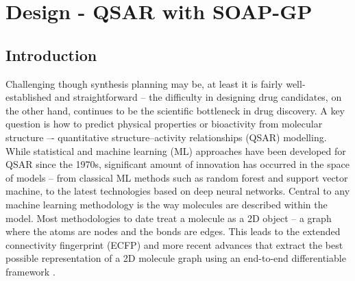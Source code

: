 
\chapter{Design - QSAR with SOAP-GP}
\section{Introduction}
Challenging though synthesis planning may be, at least it is fairly well-established and straightforward -- the difficulty in designing drug candidates, on the other hand, continues to be the scientific bottleneck in drug discovery. A key question is how to predict physical properties or bioactivity from molecular structure –- quantitative structure–activity relationships (QSAR) modelling. While statistical and machine learning (ML) approaches have been developed for QSAR since the 1970s, significant amount of innovation has occurred in the space of models -- from classical ML methods such as random forest and support vector machine, to the latest technologies based on deep neural networks. Central to any machine learning methodology is the way molecules are described within the model. Most methodologies to date treat a molecule as a 2D object -- a graph where the atoms are nodes and the bonds are edges. This leads to the extended connectivity fingerprint (ECFP) \cite{rogers2010extended} and more recent advances that extract the best possible representation of a 2D molecule graph using an end-to-end differentiable framework \cite{duvenaud2015convolutional}. 

